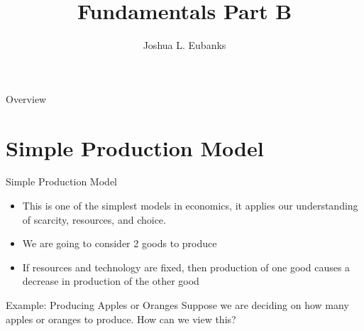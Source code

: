 \documentclass{beamer}
\title[Fundamentals]{Fundamentals Part B}
\author{Joshua L. Eubanks}
\date{\vspace{-8cm}}
\begin{document}
\begin{frame}
  \titlepage
\end{frame}

\begin{frame}{Overview}
\tableofcontents
\end{frame}


\section{Simple Production Model}

\begin{frame}{Simple Production Model}
\begin{itemize}
\item This is one of the simplest models in economics, it applies our understanding of scarcity, resources, and choice.
\item We are going to consider 2 goods to produce
\item If resources and technology are fixed, then production of one good causes a decrease in production of the other good
\end{itemize}

\begin{exampleblock}{Example: Producing Apples or Oranges}
Suppose we are deciding on how many apples or oranges to produce. How can we view this? 
\end{exampleblock}
\end{frame}
\end{document}
